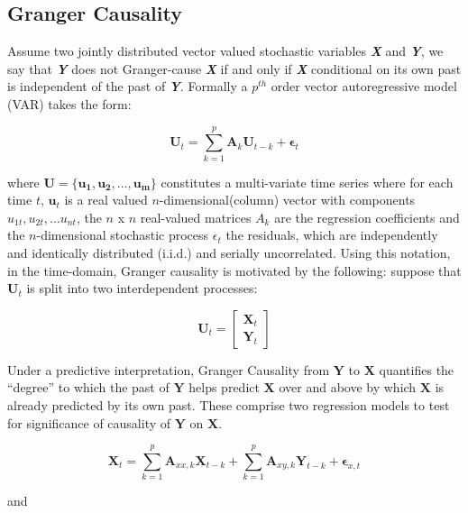 \documentclass[smallextended]{svjour3}       %
\theoremstyle{definition}
\begin{document}
\subsection{Granger Causality}
Assume two jointly distributed vector valued stochastic variables \textbf{\textit{X}} and \textbf{\textit{Y}}, we say that \textbf{\textit{Y}} does not Granger-cause \textbf{\textit{X}} if and only if \textbf{\textit{X}} conditional on its own past is independent of the past of \textbf{\textit{Y}}. Formally a $p^{th}$ order vector autoregressive model (VAR) takes the form:

\begin{equation}
\mathbf{U}_t = \sum_{k=1}^{p} \mathbf{A}_k \mathbf{U}_{t-k} + \mathbf{\epsilon}_t
\end{equation}

where $\mathbf{U}=\{\mathbf{u_1, u_2, \ldots, u_m}\}$ constitutes a multi-variate time series where for each time $t$, $\mathbf{u}_t$ is a real valued $n$-dimensional(column) vector with components $u_{1t}, u_{2t}, \ldots u_{nt}$,  the $n$ x $n$ real-valued matrices $A_k$ are the regression coefficients and the $n$-dimensional stochastic process $\epsilon_t$ the residuals, which are independently and identically distributed (i.i.d.) and serially uncorrelated.
Using this notation, in the time-domain, Granger causality is motivated by the following: suppose that $\mathbf{U}_t$ is split into two interdependent processes:

\begin{equation}
\mathbf{U}_t = 
\begin{bmatrix}
\mathbf{X}_t        \\
\mathbf{Y}_t
\end{bmatrix}
\end{equation}

Under a predictive interpretation, Granger Causality from $\mathbf{Y}$ to $\mathbf{X}$ quantifies the ``degree'' to which the past of $\mathbf{Y}$ helps predict $\mathbf{X}$ over and above by which $\mathbf{X}$ is already predicted by its own past.
These comprise two regression models to test for significance of causality of $\mathbf{Y}$ on $\mathbf{X}$. 

\begin{equation}
\mathbf{X}_t = \sum_{k=1}^p \mathbf{A}_{xx,k} \mathbf{X}_{t-k} + \sum_{k=1}^p \mathbf{A}_{xy,k} \mathbf{Y}_{t-k} + \mathbf{\epsilon}_{x,t}
\label{eq:full_reg}
\end{equation}

and 
\end{document}

